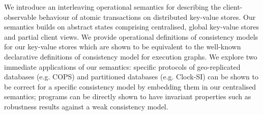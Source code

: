 
We introduce an interleaving operational semantics for describing the
client-observable behaviour of atomic transactions on distributed
key-value stores. Our semantics builds on abstract states comprising
centralised, global key-value stores and partial client views.  We provide
operational definitions of consistency models for our key-value stores which
are shown to be equivalent to the well-known declarative definitions
of consistency model for execution graphs. We explore  two
immediate applications of our semantics: specific protocols of 
geo-replicated databases (e.g. COPS) and partitioned databases
(e.g. Clock-SI) can be shown to be correct for a specific consistency
model by embedding them in our centralised semantics; 
programs can be directly shown to have invariant properties such as 
robustness results against a weak consistency model.
